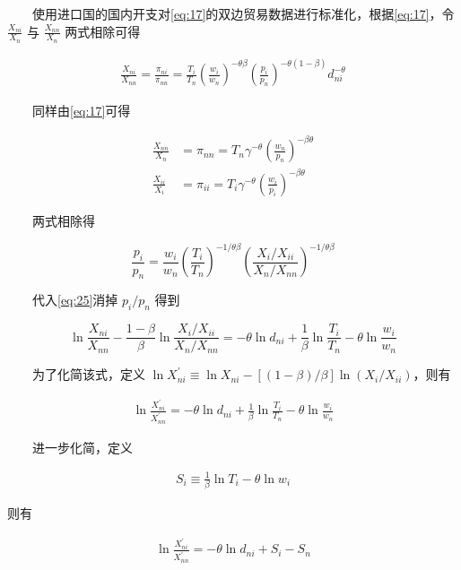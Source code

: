 \documentclass[]{article}
\begin{document}
　　使用进口国的国内开支对\eqref{eq:17}的双边贸易数据进行标准化，根据\eqref{eq:17}，令 \(\frac{X_{ni}}{X_n}\) 与 \(\frac{X_{nn}}{X_n}\) 两式相除可得

\begin{align}
\frac{X_{n i}}{X_{n n}}=\frac{\pi_{n i}}{\pi_{n n}}=\frac{T_{i}}{T_{n}}\left(\frac{w_{i}}{w_{n}}\right)^{-\theta \beta}\left(\frac{p_{i}}{p_{n}}\right)^{-\theta(1-\beta)} d_{n i}^{-\theta} \label{eq:25}
\end{align}

　　同样由\eqref{eq:17}可得

\[
\begin{aligned}
\frac{X_{n n}}{X_{n}}&=\pi_{n n}=T_{n}\gamma^{-\theta}\left(\frac{w_{n}}{p_{n}}\right)^{-\beta\theta } \\
\frac{X_{i i}}{X_{i}}&=\pi_{i i}=T_{i}\gamma^{-\theta}\left(\frac{w_{i}}{p_{i}}\right)^{-\beta\theta } 
\end{aligned}
\]

　　两式相除得

\[
\frac{p_{i}}{p_{n}}=\frac{w_{i}}{w_{n}}\left(\frac{T_{i}}{T_{n}}\right)^{-1 / \theta \beta}\left(\frac{X_{i} / X_{i i}}{X_{n} / X_{n n}}\right)^{-1 / \theta \beta}
\]

　　代入\eqref{eq:25}消掉 \({p_i}/{p_n}\) 得到

\[
\ln \frac{X_{n i}}{X_{n n}}-\frac{1-\beta}{\beta}\ln \frac{X_{i} / X_{i i}}{X_{n} / X_{n n}}=-\theta \ln d_{n i}+\frac{1}{\beta} \ln \frac{T_{i}}{T_{n}}-\theta \ln \frac{w_{i}}{w_{n}}
\]

　　为了化简该式，定义 \(\ln X_{n i}^{\prime} \equiv \ln X_{ni}-[(1-\beta)/\beta] \ln (X_i/X_{ii})\)，则有

\begin{align}
\ln \frac{X_{n i}^{\prime}}{X_{n n}^{\prime}}=-\theta \ln d_{n i}+\frac{1}{\beta} \ln \frac{T_{i}}{T_{n}}-\theta \ln \frac{w_{i}}{w_{n}} \label{eq:26}
\end{align}

　　进一步化简，定义

\begin{align}
S_i \equiv \frac{1}{\beta} \ln T_i - \theta \ln w_i \label{eq:27}
\end{align}

则有

\begin{align}
\ln \frac{X_{n i}^{\prime}}{X_{n n}^{\prime}}=-\theta \ln d_{n i}+S_i-S_n \label{eq:28}
\end{align}
\end{document}
